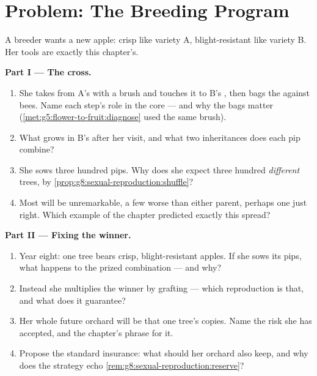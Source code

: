 \section{Problem: The Breeding Program}

\begin{problem}\label{pb:g8:sexual-reproduction:1}
A breeder wants a new apple: crisp like variety A,
blight-resistant like variety B. Her tools are exactly
this chapter's.

\medskip\noindent\textbf{Part I --- The cross.}
\begin{enumerate}
  \item She takes  from A's  with a brush
        and touches it to B's , then bags the
         against bees. Name each step's role in
        the core --- and why the bags matter
        (\cref{met:g5:flower-to-fruit:diagnose} used the
        same brush).
  \item What grows in B's  after her visit, and
        what two inheritances does each pip combine?
  \item She sows three hundred pips. Why does she expect
        three hundred \emph{different} trees, by
        \cref{prop:g8:sexual-reproduction:shuffle}?
  \item Most  will be unremarkable, a few
        worse than either parent, perhaps one just
        right. Which example of the chapter predicted
        exactly this spread?
\end{enumerate}

\medskip\noindent\textbf{Part II --- Fixing the winner.}
\begin{enumerate}[resume]
  \item Year eight: one tree bears crisp,
        blight-resistant apples. If she sows its pips,
        what happens to the prized combination --- and
        why?
  \item Instead she multiplies the winner by grafting
        --- which reproduction is that, and what does
        it guarantee?
  \item Her whole future orchard will be that one
        tree's copies. Name the risk she has accepted,
        and the chapter's phrase for it.
  \item Propose the standard insurance: what should
        her orchard also keep, and why does the
        strategy echo
        \cref{rem:g8:sexual-reproduction:reserve}?
\end{enumerate}


\end{problem}
